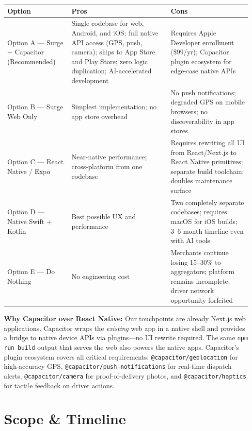 \documentclass[11pt, letterpaper]{article}
\begin{document}
\begin{center}
\begin{tabularx}{\textwidth}{@{}l X X@{}}
\toprule
\textbf{Option} & \textbf{Pros} & \textbf{Cons} \\
\midrule
Option A --- Surge + Capacitor (Recommended) & Single codebase for web, Android, and iOS; full native API access (GPS, push, camera); ships to App Store and Play Store; zero logic duplication; AI-accelerated development & Requires Apple Developer enrollment (\$99/yr); Capacitor plugin ecosystem for edge-case native APIs \\
Option B --- Surge Web Only & Simplest implementation; no app store overhead & No push notifications; degraded GPS on mobile browsers; no discoverability in app stores \\
Option C --- React Native / Expo & Near-native performance; cross-platform from one codebase & Requires rewriting all UI from React/Next.js to React Native primitives; separate build toolchain; doubles maintenance surface \\
Option D --- Native Swift + Kotlin & Best possible UX and performance & Two completely separate codebases; requires macOS for iOS builds; 3--6 month timeline even with AI tools \\
Option E --- Do Nothing & No engineering cost & Merchants continue losing 15--30\% to aggregators; platform remains incomplete; driver network opportunity forfeited \\
\bottomrule
\end{tabularx}
\end{center}

\begin{insightbox}
\textbf{Why Capacitor over React Native:} Our touchpoints are already Next.js web applications. Capacitor wraps the \emph{existing} web app in a native shell and provides a bridge to native device APIs via plugins---no UI rewrite required. The same \texttt{npm run build} output that serves the web also powers the native apps. Capacitor's plugin ecosystem covers all critical requirements: \texttt{@capacitor/geolocation} for high-accuracy GPS, \texttt{@capacitor/push-notifications} for real-time dispatch alerts, \texttt{@capacitor/camera} for proof-of-delivery photos, and \texttt{@capacitor/haptics} for tactile feedback on driver actions.
\end{insightbox}

\section{Scope \& Timeline}
\end{document}
